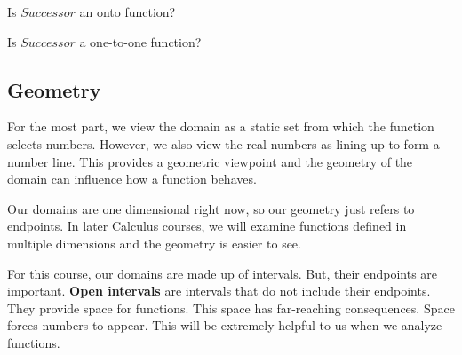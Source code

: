 \documentclass{ximera}
\begin{document}
\begin{question} 
Is $Successor$ an onto function?
\begin{multipleChoice}
\end{multipleChoice}
\end{question} 



\begin{question} 
Is $Successor$ a one-to-one function?
\begin{multipleChoice}
\end{multipleChoice}
\end{question} 






\subsection*{Geometry}

For the most part, we view the domain as a static set from which the function selects numbers. However, we also view the real numbers as lining up to form a number line. This provides a geometric viewpoint and the geometry of the domain can influence how a function behaves.


Our domains are one dimensional right now, so our geometry just refers to endpoints.  In later Calculus courses, we will examine functions defined in multiple dimensions and the geometry is easier to see.

For this course, our domains are made up of intervals.  But, their endpoints are important. \textbf{Open intervals} are intervals that do not include their endpoints.  They provide space for functions.  This space has far-reaching consequences. Space forces numbers to appear. This will be extremely helpful to us when we analyze functions. 
\end{document}
